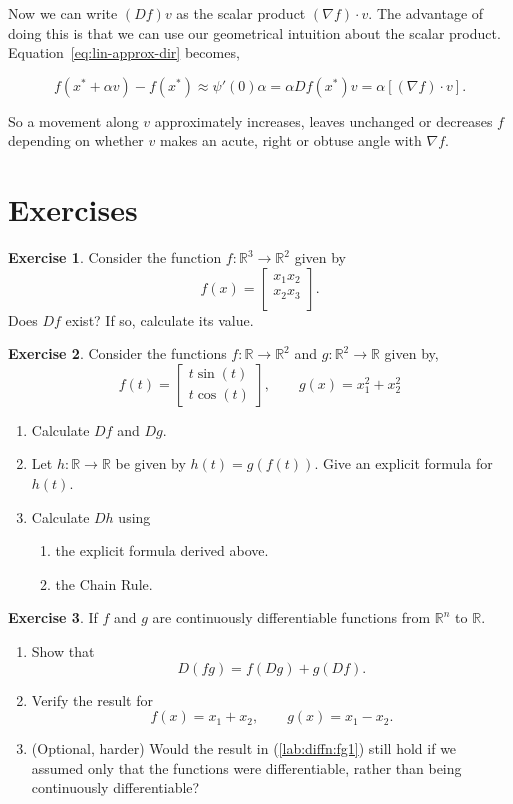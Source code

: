 \documentclass[11pt,reqno,openany]{amsbook}
\numberwithin{figure}{chapter}
\numberwithin{equation}{chapter}
\theoremstyle{plain}
\theoremstyle{definition}
\newtheorem{xca}{Exercise}[chapter]
\newcommand{\dotprod}[2]{{#1}\cdot{#2}}
\renewcommand{\Re}{\mathbb{R}}
\begin{document}
Now we can write $(Df)v$ as the scalar product $\dotprod{(\nabla
f)}{v}$. The advantage of doing this is that we can use our
geometrical intuition about the scalar product.
Equation~\eqref{eq:lin-approx-dir} becomes,

\[
f(x^*+\alpha v) - f(x^*)  \approx
\psi'(0)\alpha = \alpha Df(x^*)v = \alpha[\dotprod{(\nabla
  f)}{v}].\]

So a movement along $v$ approximately increases, leaves
unchanged or decreases $f$ depending on whether $v$ makes an
acute, right or obtuse angle with $\nabla f$.

\section*{Exercises}
\begin{xca}
  Consider the function $f\colon \Re^3 \to \Re^2$ given by
  \[f(x) = \begin{bmatrix}
    x_1x_2\\
    x_2x_3\\
    \end{bmatrix}.
   \]
   Does $Df$ exist? If so, calculate its value.
\end{xca}
\begin{xca}
  Consider the functions $f\colon \Re \to \Re^2$ and
  $g\colon \Re^2 \to \Re$ given by,
  \[f(t)=\begin{bmatrix}
    t\sin(t)\\
    t\cos(t)
    \end{bmatrix},\qquad
    g(x) = x_1^2 + x_2^2
  \]
  \begin{enumerate}
  \item Calculate $Df$ and $Dg$.
  \item Let $h\colon \Re \to \Re$ be given by $h(t) =
    g(f(t))$. Give an explicit formula for $h(t)$.
  \item Calculate $Dh$ using
    \begin{enumerate}
    \item the explicit formula derived above.
    \item the Chain Rule.
    \end{enumerate}
  \end{enumerate}
\end{xca}

\begin{xca}
  If $f$ and $g$ are continuously differentiable functions
  from $\Re^n$ to $\Re$.
  \begin{enumerate}
    \item\label{lab:diffn:fg1} Show that
      \[D(fg) = f(Dg) + g(Df).\]
    \item Verify the result for
      \[f(x) = x_1+x_2,\qquad g(x) = x_1 - x_2.\]
    \item (Optional, harder) Would the result in
      (\ref{lab:diffn:fg1}) still hold if we assumed only that
      the functions were differentiable, rather than being
      continuously differentiable?
    \end{enumerate}
\end{xca}
\end{document}
